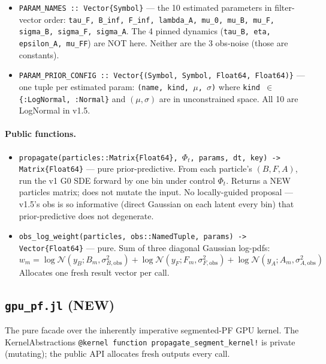 \documentclass[11pt,a4paper]{article}
\begin{document}
\begin{itemize}[itemsep=2pt,leftmargin=*]
\item \texttt{PARAM\_NAMES :: Vector\{Symbol\}} --- the 10 estimated
  parameters in filter-vector order: \texttt{tau\_F, B\_inf, F\_inf,
  lambda\_A, mu\_0, mu\_B, mu\_F, sigma\_B, sigma\_F, sigma\_A}.
  The 4 pinned dynamics (\texttt{tau\_B, eta, epsilon\_A, mu\_FF})
  are NOT here. Neither are the 3 obs-noise (those are constants).
\item \texttt{PARAM\_PRIOR\_CONFIG :: Vector\{(Symbol, Symbol,
  Float64, Float64)\}} --- one tuple per estimated param:
  \texttt{(name, kind, $\mu$, $\sigma$)} where \texttt{kind $\in$
  \{:LogNormal, :Normal\}} and $(\mu, \sigma)$ are in unconstrained
  space. All 10 are LogNormal in v1.5.
\end{itemize}

\paragraph{Public functions.}

\begin{itemize}[itemsep=2pt,leftmargin=*]
\item \texttt{propagate(particles::Matrix\{Float64\}, $\Phi_t$,
  params, dt, key) -> Matrix\{Float64\}} --- pure prior-predictive.
  From each particle's $(B, F, A)$, run the v1 G0 SDE forward by
  one bin under control $\Phi_t$. Returns a NEW particles matrix;
  does not mutate the input. No locally-guided proposal --- v1.5's
  obs is so informative (direct Gaussian on each latent every bin)
  that prior-predictive does not degenerate.

\item \texttt{obs\_log\_weight(particles, obs::NamedTuple, params)
  -> Vector\{Float64\}} --- pure. Sum of three diagonal Gaussian
  log-pdfs:
  \[
  w_m = \log \mathcal N(y_B; B_m, \sigma_{B,\text{obs}}^2)
  + \log \mathcal N(y_F; F_m, \sigma_{F,\text{obs}}^2)
  + \log \mathcal N(y_A; A_m, \sigma_{A,\text{obs}}^2)
  \]
  Allocates one fresh result vector per call.
\end{itemize}

\subsection{\texttt{gpu\_pf.jl} (NEW)}

The pure facade over the inherently imperative segmented-PF GPU
kernel. The KernelAbstractions \texttt{@kernel function
propagate\_segment\_kernel!} is private (mutating); the public API
allocates fresh outputs every call.
\end{document}
